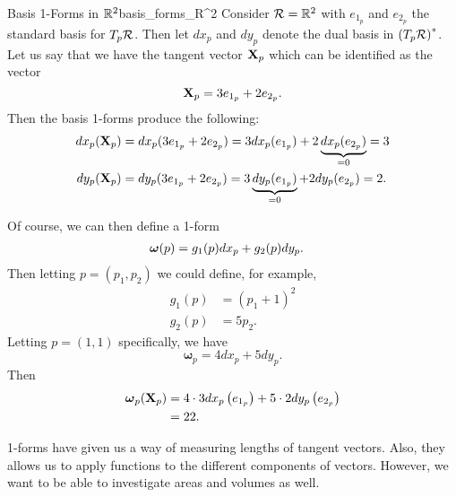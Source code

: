 \begin{ex}{Basis 1-Forms in $\mathbb{R}^2$}{basis_forms_R^2}
Consider $\mathcal{R} = \mathbb{R}^2$ with $e_{1_p}$ and $e_{2_p}$ the standard basis for $T_p\mathcal{R}$. Then let $dx_p$ and $dy_p$ denote the dual basis in $\left(T_p\mathcal{R}\right)^*$. Let us say that we have the tangent vector $\mathbf{X}_p$ which can be identified as the vector
\[
\mathbf{X}_p = 3e_{1_p}+2e_{2_p}.
\]
Then the basis 1-forms produce the following:
\begin{align*}
    dx_p(\mathbf{X}_p)&=dx_p(3e_{1_p}+2e_{2_p})=3dx_p(e_{1_p})+2\underbrace{dx_p(e_{2_p})}_{=0}=3\\
    dy_p(\mathbf{X}_p)&=dy_p(3e_{1_p}+2e_{2_p})=3\underbrace{dy_p(e_{1_p})}_{=0}+2dy_p(e_{2_p})=2.\\
\end{align*}
        \begin{center}
        \end{center}
        Of course, we can then define a 1-form 
        \begin{align*}
        \boldsymbol{\omega}(p)&=g_1(p)dx_p+g_2(p)dy_p.
        \end{align*}
        Then letting $p=(p_1,p_2)$ we could define, for example,
        \begin{align*}
            g_1(p)&=(p_1+1)^2\\
            g_2(p)&=5p_2.
        \end{align*}
        Letting $p=(1,1)$ specifically, we have
        \[
        \boldsymbol{\omega}_{p}=4dx_p+5dy_p.
        \]
        Then
        \begin{align*}
        \boldsymbol{\omega}_p(\mathbf{X}_p)&=4\cdot 3dx_p\left(e_{1_p}\right)+5\cdot 2dy_p\left(e_{2_p}\right)\\
        &=22.
        \end{align*}
        \end{ex}
        
        \begin{remark}
        1-forms have given us a way of measuring lengths of tangent vectors.  Also, they allows us to apply functions to the different components of vectors.  However, we want to be able to investigate areas and volumes as well. 
        \end{remark}
        
